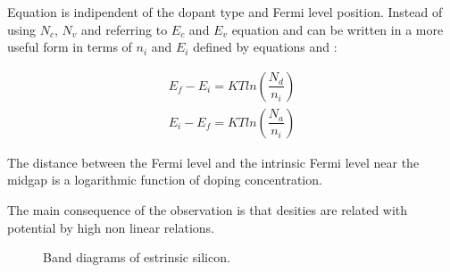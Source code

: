 Equation  is indipendent of the dopant type and Fermi level position.
Instead of using $N_c$, $N_v$ and referring to $E_c$ and $E_v$ equation  and  can be written in a more useful form in terms of $n_i$ and $E_i$ defined by equations  and :

 \begin{align}
 E_f-E_i = KTln\left(\dfrac{N_d}{n_i}\right)  \label{eq: Ef in n-type Ei} \\
 E_i-E_f = KTln\left(\dfrac{N_a}{n_i}\right)  \label{eq: Ef in p-type Ei} 
 \end{align}

\begin{Osservazione}
The distance between the Fermi level and the intrinsic Fermi level near the midgap is a logarithmic function of doping concentration.
\end{Osservazione}

The main consequence of the observation is that desities are related with potential by high non linear relations.

\begin{figure}[!h]
\centering
{}
\caption{Band diagrams of estrinsic silicon.}
\label{fig: Band diagrams of estrinsic silicon}
\end{figure}

